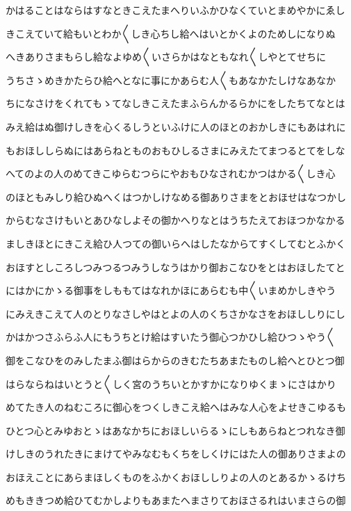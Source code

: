 \documentclass[a4paper,11pt,landscape]{ltjtarticle}
\begin{document}
かはることはならはすなときこえたまへりいふかひなくていとまめやかにゑし
\par\medskip
きこえていて給もいとわか〱しき心ちし給へはいとかくよのためしになりぬ
\par\medskip
へきありさまもらし給なよゆめ〱いさらかはなともなれ〱しやとてせちに
\par\medskip
うちさゝめきかたらひ給へとなに事にかあらむ人〱もあなかたしけなあなか
\par\medskip
ちになさけをくれてもゝてなしきこえたまふらんかるらかにをしたちてなとは
\par\medskip
みえ給はぬ御けしきを心くるしうといふけに人のほとのおかしきにもあはれに
\par\medskip
もおほししらぬにはあらねとものおもひしるさまにみえたてまつるとてをしな
\par\medskip
へてのよの人のめてきこゆらむつらにやおもひなされむかつはかる〱しき心
\par\medskip
のほともみしり給ひぬへくはつかしけなめる御ありさまをとおほせはなつかし
\par\medskip
からむなさけもいとあひなしよその御かへりなとはうちたえておほつかなかる
\par\medskip
ましきほとにきこえ給ひ人つての御いらへはしたなからてすくしてむとふかく
\par\medskip
おほすとしころしつみつるつみうしなうはかり御おこなひをとはおほしたてと
\par\medskip
にはかにかゝる御事をしももてはなれかほにあらむも中〱いまめかしきやう
\par\medskip
にみえきこえて人のとりなさしやはとよの人のくちさかなさをおほししりにし
\par\medskip
かはかつさふらふ人にもうちとけ給はすいたう御心つかひし給ひつゝやう〱
\par\medskip
御をこなひをのみしたまふ御はらからのきむたちあまたものし給へとひとつ御
\par\medskip
はらならねはいとうと〱しく宮のうちいとかすかになりゆくまゝにさはかり
\par\medskip
めてたき人のねむころに御心をつくしきこえ給へはみな人心をよせきこゆるも
\par\medskip
ひとつ心とみゆおとゝはあなかちにおほしいらるゝにしもあらねとつれなき御
\par\medskip
けしきのうれたきにまけてやみなむもくちをしくけにはた人の御ありさまよの
\par\medskip
おほえことにあらまほしくものをふかくおほししりよの人のとあるかゝるけち
\par\medskip
めもききつめ給ひてむかしよりもあまたへまさりておほさるれはいまさらの御
\end{document}
